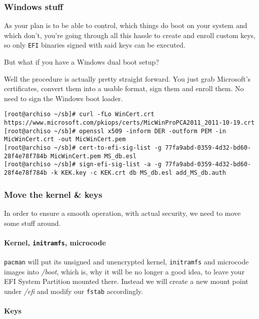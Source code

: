 \documentclass[10pt]{dustdoc}
\begin{document}
\subsubsection{Windows stuff}
\label{sec:windows-stuff}

As your plan is to be able to control, which things do boot on your system and which don’t, you’re going through all this hassle to create and enroll custom keys, so only \texttt{EFI} binaries signed with said keys can be executed.

But what if you have a Windows dual boot setup?

Well the procedure is actually pretty straight forward.
You just grab Microsoft’s certificates, convert them into a usable format, sign them and enroll them.
No need to sign the Windows boot loader.

\begin{verbatim}
[root@archiso ~/sb]# curl -fLo WinCert.crt https://www.microsoft.com/pkiops/certs/MicWinProPCA2011_2011-10-19.crt
[root@archiso ~/sb]# openssl x509 -inform DER -outform PEM -in MicWinCert.crt -out MicWinCert.pem
[root@archiso ~/sb]# cert-to-efi-sig-list -g 77fa9abd-0359-4d32-bd60-28f4e78f784b MicWinCert.pem MS_db.esl
[root@archiso ~/sb]# sign-efi-sig-list -a -g 77fa9abd-0359-4d32-bd60-28f4e78f784b -k KEK.key -c KEK.crt db MS_db.esl add_MS_db.auth
\end{verbatim}

\subsubsection{Move the kernel \& keys}
\label{sec:move-the-kernel-and-keys}

In order to ensure a smooth operation, with actual security, we need to move some stuff around.

\paragraph{Kernel, \texttt{initramfs}, microcode}
\label{par:kernel-initramfs-microcode}

\texttt{pacman} will put its unsigned and unencrypted kernel, \texttt{initramfs} and microcode images into \textit{/boot}, which is, why it will be no longer a good idea, to leave your EFI System Partition mounted there.
Instead we will create a new mount point under \textit{/efi} and modify our \texttt{fstab} accordingly.

\paragraph{Keys}
\label{par:keys}
\end{document}
